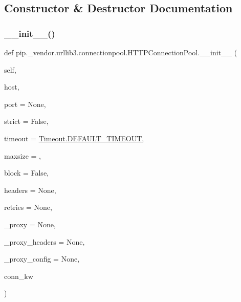\subsection{Constructor \& Destructor Documentation}
\mbox{\label{classpip_1_1__vendor_1_1urllib3_1_1connectionpool_1_1HTTPConnectionPool_a9b82b015413ba9d62417eceb3d5b93f8}} 
\subsubsection{\texorpdfstring{\+\_\+\+\_\+init\+\_\+\+\_\+()}{\_\_init\_\_()}}
{\footnotesize\ttfamily def pip.\+\_\+vendor.\+urllib3.\+connectionpool.\+H\+T\+T\+P\+Connection\+Pool.\+\_\+\+\_\+init\+\_\+\+\_\+ (\begin{DoxyParamCaption}\item[{}]{self,  }\item[{}]{host,  }\item[{}]{port = {\ttfamily None},  }\item[{}]{strict = {\ttfamily False},  }\item[{}]{timeout = {\ttfamily \hyperlink{classpip_1_1__vendor_1_1urllib3_1_1util_1_1timeout_1_1Timeout_ab2e2090779413149cdac51e5b0908e12}{Timeout.\+D\+E\+F\+A\+U\+L\+T\+\_\+\+T\+I\+M\+E\+O\+UT}},  }\item[{}]{maxsize = {},  }\item[{}]{block = {\ttfamily False},  }\item[{}]{headers = {\ttfamily None},  }\item[{}]{retries = {\ttfamily None},  }\item[{}]{\+\_\+proxy = {\ttfamily None},  }\item[{}]{\+\_\+proxy\+\_\+headers = {\ttfamily None},  }\item[{}]{\+\_\+proxy\+\_\+config = {\ttfamily None},  }\item[{}]{conn\+\_\+kw }\end{DoxyParamCaption})}



